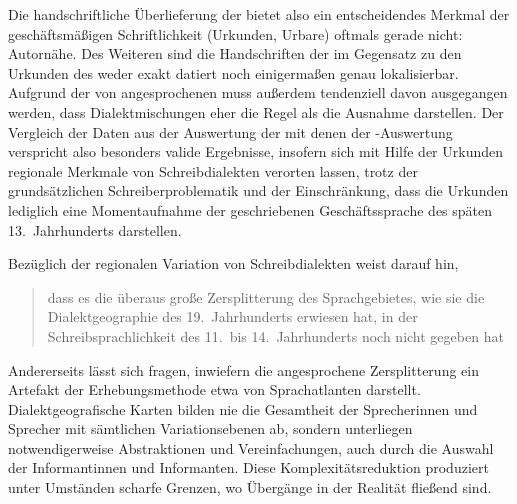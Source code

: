Die handschriftliche Überlieferung der \KC{} bietet also ein
entscheidendes Merkmal der geschäftsmäßigen Schriftlichkeit (Urkunden, Urbare)
oftmals gerade nicht: Autornähe. Des Weiteren sind die Handschriften der
\KC{} im Gegensatz zu den Urkunden des \CAO{} weder exakt datiert
noch einigermaßen genau lokalisierbar. Aufgrund der von
\citet[1310]{wegera2000} angesprochenen  muss außerdem
tendenziell davon ausgegangen werden, dass Dialekt\-mischungen eher die Regel
als die Ausnahme darstellen. Der Vergleich der Daten aus der Auswertung der
\KC{} mit denen der \CAO{}-Auswertung verspricht also besonders
valide Ergebnisse, insofern sich mit Hilfe der Urkunden regionale Merkmale von
Schreibdialekten verorten lassen, trotz der grundsätzlichen
Schreiberproblematik und der Einschränkung, dass die Urkunden lediglich eine
Momentaufnahme der geschriebenen Geschäftssprache des späten 13.~Jahrhunderts
darstellen.

Bezüglich der regionalen Variation von Schreibdialekten weist \citet{solms2014}
darauf hin, \blockcquote[132]{solms2014}{dass es die überaus große
Zersplitterung des Sprachgebietes, wie sie die Dialektgeographie des
19.~Jahrhunderts erwiesen hat, in der Schreibsprachlichkeit des 11.\ bis
14.~Jahrhunderts noch nicht gegeben hat}. Andererseits lässt sich fragen,
inwiefern die angesprochene Zersplitterung ein Artefakt der Erhebungsmethode
etwa von Sprachatlanten darstellt. Dialektgeografische Karten bilden nie die
Gesamtheit der Sprecherinnen und Sprecher mit sämtlichen Variations\-ebenen ab,
sondern unterliegen notwendigerweise Abstraktionen und Vereinfachungen, auch
durch die Auswahl der Informantinnen und Informanten. Diese
Komplexitätsreduktion produziert unter Umständen scharfe Grenzen, wo Übergänge
in der Realität fließend sind.
